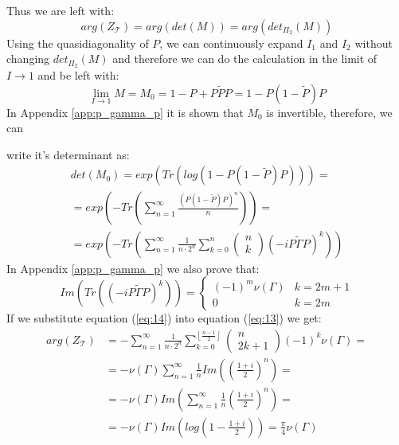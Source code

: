 \documentclass[%
 reprint,
 amsmath,amssymb,
 aps,
]{revtex4-2}
\begin{document}
Thus we are left with:
\begin{equation}
    arg(Z_{\mathcal{T}}) = arg(det(M)) = arg(det_{\Pi_2}(M))
\end{equation}
Using the quasidiagonality of $P$, we can continuously expand $I_1$ and $I_2$ without changing $det_{\Pi_2}(M)$ and therefore we can do the calculation in the limit of $I\rightarrow1$ and be left with:
\begin{equation}
    \lim_{I\rightarrow1}M=M_0=1-P+P\tilde PP=1-P(1-\tilde P)P
\end{equation}
In Appendix \ref{app:p_gamma_p} it is shown that $M_0$ is invertible, therefore, we can

write it's determinant as:
\begin{equation}
\label{eq:13}
    \begin{split}
        det(M_0)=exp\left(Tr\left(log\left(1-P(1-\tilde P)P\right)\right)\right)= \\
        =exp\left(-Tr\left(\sum_{n=1}^\infty\frac{\left(P(1-\tilde P)P\right)^n}{n}\right)\right)= \\
        =exp\left(-Tr\left(\sum_{n=1}^\infty\frac{1}{n\cdot2^n}\sum_{k=0}^n \begin{pmatrix}n \\ k\end{pmatrix}(-iP\tilde\Gamma P)^k\right)\right)
    \end{split}
\end{equation}
In Appendix \ref{app:p_gamma_p} we also prove that:
\begin{equation}
\label{eq:14}
    Im(Tr((-iP\tilde\Gamma P)^k)) = \left\{\begin{matrix} (-1)^m\nu(\Gamma) & k=2m+1 \\ 0 & k=2m\end{matrix}\right.
\end{equation}
If we substitute equation (\ref{eq:14}) into equation (\ref{eq:13}) we get:
\begin{equation}
    \begin{split}
        arg(Z_{\mathcal{T}}) &= -\sum_{n=1}^\infty\frac{1}{n\cdot2^n}\sum_{k=0}^{\left\lfloor\frac{n-1}{2}\right\rfloor} \begin{pmatrix}n \\ 2k+1\end{pmatrix}(-1)^k\nu(\Gamma)=\\
        &=-\nu(\Gamma)\sum_{n=1}^\infty\frac{1}{n}Im\left(\left(\frac{1+i}{2}\right)^n\right)=\\
        &=-\nu(\Gamma)Im\left(\sum_{n=1}^\infty\frac{1}{n}\left(\frac{1+i}{2}\right)^n\right)=\\
        &=-\nu(\Gamma)Im\left(log\left(1 - \frac{1+i}{2}\right)\right)=\frac{\pi}{4}\nu(\Gamma)
    \end{split}
\end{equation}
\end{document}

